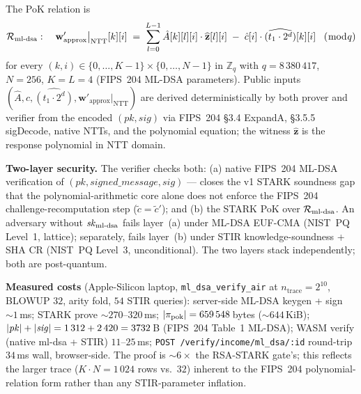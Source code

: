 \documentclass[11pt,a4paper]{article}
\begin{document}
The PoK relation is
\[
\mathcal{R}_{\mathrm{ml\textnormal-dsa}} : \quad
\mathbf{w}'_{\mathrm{approx}}\big|_{\mathrm{NTT}}[k][i] \;=\;
\sum_{l=0}^{L-1} \hat{A}[k][l][i]\cdot\widehat{\mathbf{z}}[l][i]
\;-\;\hat{c}[i]\cdot\widehat{(t_1\cdot 2^d)}[k][i]
\;\;\;(\bmod q)
\]
for every $(k,i) \in \{0,\dots,K{-}1\}\times\{0,\dots,N{-}1\}$
in $\mathbb{Z}_q$ with $q=8\,380\,417$, $N=256$, $K=L=4$ (FIPS~204
ML\nobreakdash-DSA parameters).  Public inputs
$(\hat{A}, \hat{c}, \widehat{(t_1\cdot 2^d)},
\mathbf{w}'_{\mathrm{approx}}|_{\mathrm{NTT}})$ are derived
deterministically by both prover and verifier from the encoded
$(\mathit{pk}, \mathit{sig})$ via FIPS~204 §3.4 ExpandA, §3.5.5
sigDecode, native NTTs, and the polynomial equation; the witness
$\widehat{\mathbf{z}}$ is the response polynomial in NTT domain.

\textbf{Two\nobreakdash-layer security.}  The verifier checks
both: (a) native FIPS~204 ML\nobreakdash-DSA
verification of $(\mathit{pk}, \mathit{signed\_message},
\mathit{sig})$ — closes the v1 STARK soundness gap that the
polynomial\nobreakdash-arithmetic core alone does not enforce
the FIPS~204 challenge\nobreakdash-recomputation step
($\tilde{c}=\tilde{c}'$); and (b) the STARK PoK over
$\mathcal{R}_{\mathrm{ml\textnormal-dsa}}$.  An adversary
without $\mathit{sk}_{\mathrm{ml\textnormal-dsa}}$ fails layer~(a)
under ML\nobreakdash-DSA EUF\nobreakdash-CMA
(NIST~PQ Level~1, lattice); separately, fails layer~(b) under
STIR knowledge\nobreakdash-soundness + SHA CR
(NIST~PQ Level~3, unconditional).  The two layers stack
independently; both are post\nobreakdash-quantum.

\textbf{Measured costs} (Apple\nobreakdash-Silicon laptop,
\texttt{ml\_dsa\_verify\_air} at $n_{\mathrm{trace}}=2^{10}$,
BLOWUP $32$, arity fold,
$54$ STIR queries):
server\nobreakdash-side ML\nobreakdash-DSA keygen + sign
$\sim\!\num{1}$\,ms; STARK prove $\sim\!\num{270}$--$\num{320}$\,ms;
$|\pi_{\mathrm{pok}}| = \num{659\,548}$\,bytes
($\sim\!\num{644}$\,KiB);
$|\mathit{pk}|+|\mathit{sig}|=1\,312+2\,420=\num{3\,732}$\,B
(FIPS~204 Table~1 ML\nobreakdash-DSA);
WASM verify (native ml\nobreakdash-dsa + STIR) $\num{11}$--$\num{25}$\,ms;
\texttt{POST /verify/income/ml\_dsa/:id} round\nobreakdash-trip
$\num{34}$\,ms wall, browser\nobreakdash-side.  The proof is
$\sim\!6\times$ the RSA\nobreakdash-STARK gate's; this reflects
the larger trace ($K\cdot N=1\,024$ rows vs.\ $32$) inherent to
the FIPS~204 polynomial\nobreakdash-relation form rather than
any STIR\nobreakdash-parameter inflation.
\end{document}
